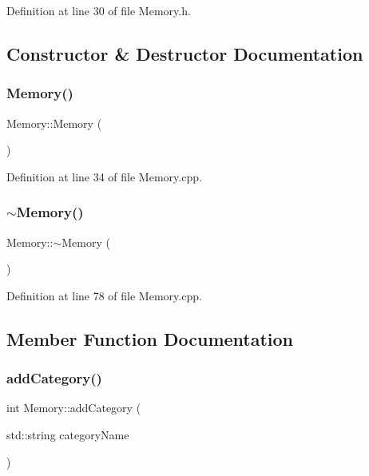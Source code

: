 Definition at line 30 of file Memory.\+h.



\subsection{Constructor \& Destructor Documentation}
\mbox{\label{class_memory_a585d7bb6fc6f2237bcebf94a86b7dd99}} 
\subsubsection{\texorpdfstring{Memory()}{Memory()}}
{\footnotesize\ttfamily Memory\+::\+Memory (\begin{DoxyParamCaption}{ }\end{DoxyParamCaption})}



Definition at line 34 of file Memory.\+cpp.

\mbox{\label{class_memory_a0ffa9759ebbf103f11132a505b93bdc0}} 
\subsubsection{\texorpdfstring{$\sim$\+Memory()}{~Memory()}}
{\footnotesize\ttfamily Memory\+::$\sim$\+Memory (\begin{DoxyParamCaption}{ }\end{DoxyParamCaption})}



Definition at line 78 of file Memory.\+cpp.



\subsection{Member Function Documentation}
\mbox{\label{class_memory_a082886bbe8c386bb7ce25a25f1b7ea8a}} 
\subsubsection{\texorpdfstring{add\+Category()}{addCategory()}}
{\footnotesize\ttfamily int Memory\+::add\+Category (\begin{DoxyParamCaption}\item[{std\+::string}]{category\+Name }\end{DoxyParamCaption})}

